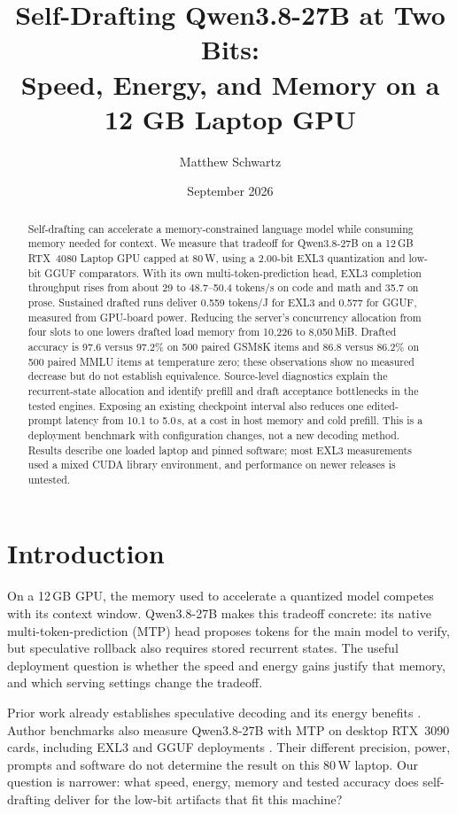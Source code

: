 \documentclass[11pt]{article}
\title{\textbf{Self-Drafting Qwen3.8-27B at Two Bits:\\
Speed, Energy, and Memory on a 12 GB Laptop GPU}}
\author{Matthew Schwartz\singleauthorinfo{Independent researcher \enspace
\href{https://orcid.org/0009-0009-4171-7247}{ORCID 0009-0009-4171-7247}
\enspace \texttt{matthew.schwartz.research@gmail.com}}}
\date{September 2026}
\begin{document}
\maketitle

\begin{abstract}
\noindent
Self-drafting can accelerate a memory-constrained language model while
consuming memory needed for context. We measure that tradeoff for
Qwen3.8-27B on a 12\,GB RTX~4080 Laptop GPU capped at 80\,W, using a
2.00-bit EXL3 quantization and low-bit GGUF comparators. With its own
multi-token-prediction head, EXL3 completion throughput rises from about 29 to
48.7--50.4 tokens/s on code and math and 35.7 on prose. Sustained drafted
runs deliver 0.559 tokens/J for EXL3 and 0.577 for GGUF, measured from
GPU-board power. Reducing the server's concurrency allocation from four
slots to one lowers drafted load memory from 10,226 to 8,050\,MiB.
Drafted accuracy is 97.6 versus 97.2\% on 500 paired GSM8K items and 86.8
versus 86.2\% on 500 paired MMLU items at temperature zero; these observations
show no measured decrease but do not establish equivalence. Source-level
diagnostics explain the recurrent-state allocation and identify prefill and
draft acceptance bottlenecks in the tested engines. Exposing an existing
checkpoint interval also reduces one edited-prompt latency from 10.1 to
5.0\,s, at a cost in host memory and cold prefill. This is a deployment
benchmark with configuration changes, not a new decoding method. Results
describe one loaded laptop and pinned software; most EXL3 measurements used
a mixed CUDA library environment, and performance on newer releases is untested.
\end{abstract}

\section{Introduction}

On a 12\,GB GPU, the memory used to accelerate a quantized model competes
with its context window. Qwen3.8-27B makes this tradeoff concrete: its native
multi-token-prediction (MTP) head proposes tokens for the main model to verify,
but speculative rollback also requires stored recurrent states. The useful
deployment question is whether the speed and energy gains justify that
memory, and which serving settings change the tradeoff.

Prior work already establishes speculative decoding and its energy benefits
\citep{leviathan2023fast,chen2023accelerating,dutta2026specenergy}. Author
benchmarks also measure Qwen3.8-27B with MTP on desktop RTX~3090 cards,
including EXL3 and GGUF deployments \citep{ollman2026qwen38,ang2026qwen38,
tsai2026rtx3090spec}. Their different precision, power, prompts and software
do not determine the result on this 80\,W laptop. Our question is narrower:
what speed, energy, memory and tested accuracy does self-drafting deliver
for the low-bit artifacts that fit this machine?
\end{document}

